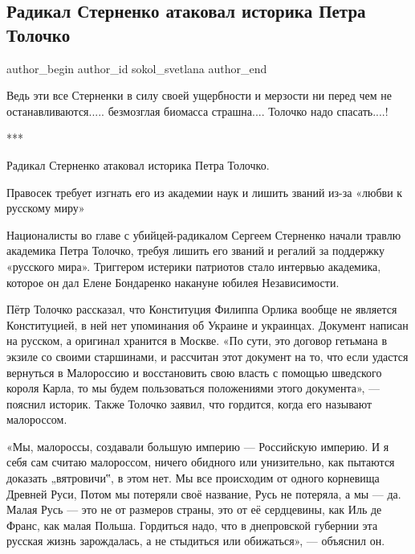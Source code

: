  
 
 
 
 
 
\subsection{Радикал Стерненко атаковал историка Петра Толочко}
\label{sec:06_09_2021.fb.sokol_svetlana.1.sternenko_tolochko}
 
\ifcmt
 author_begin
   author_id sokol_svetlana
 author_end
\fi

Ведь эти все Стерненки в силу своей ущербности  и  мерзости ни перед чем не
останавливаются..... безмозглая биомасса страшна.... Толочко надо спасать....!

***

Радикал Стерненко атаковал историка Петра Толочко. 

Правосек требует изгнать его из академии наук и лишить званий из-за «любви к
русскому миру»

Националисты во главе с убийцей-радикалом Сергеем Стерненко начали травлю
академика Петра Толочко, требуя лишить его званий и регалий за поддержку
«русского мира». Триггером истерики патриотов стало интервью академика, которое
он дал Елене Бондаренко накануне юбилея Независимости.

Пётр Толочко рассказал, что Конституция Филиппа Орлика вообще не является
Конституцией, в ней нет упоминания об Украине и украинцах. Документ написан на
русском, а оригинал хранится в Москве. «По сути, это договор гетьмана в экзиле
со своими старшинами, и рассчитан этот документ на то, что если удастся
вернуться в Малороссию и восстановить свою власть с помощью шведского короля
Карла, то мы будем пользоваться положениями этого документа», — пояснил
историк. Также Толочко заявил, что гордится, когда его называют малороссом.

«Мы, малороссы, создавали большую империю — Российскую империю. И я себя сам
считаю малороссом, ничего обидного или унизительно, как пытаются доказать
„вятровичи‟, в этом нет. Мы все происходим от одного корневища Древней Руси,
Потом мы потеряли своё название, Русь не потеряла, а мы — да. Малая Русь — это
не от размеров страны, это от её сердцевины, как Иль де Франс, как малая
Польша. Гордиться надо, что в днепровской губернии эта русская жизнь
зарождалась, а не стыдиться или обижаться», — объяснил он.

